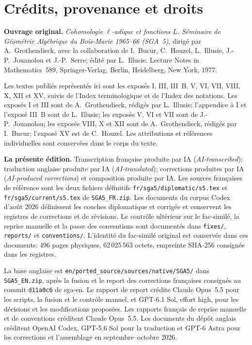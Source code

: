\section*{Cr\'edits, provenance et droits}
\begingroup\small
\noindent\textbf{Ouvrage original.} \textit{Cohomologie $\ell$-adique et fonctions $L$. S\'eminaire de G\'eom\'etrie Alg\'ebrique du Bois-Marie 1965--66 (SGA~5)}, dirig\'e par A.~Grothendieck, avec la collaboration de I.~Bucur, C.~Houzel, L.~Illusie, J.-P.~Jouanolou et J.-P.~Serre; \'edit\'e par L.~Illusie. Lecture Notes in Mathematics~589, Springer-Verlag, Berlin, Heidelberg, New York, 1977.

Les textes publi\'es repr\'esent\'es ici sont les expos\'es I, III, III~B, V, VI, VII, VIII, X, XII et XV, suivis de l'Index terminologique et de l'Index des notations. Les expos\'es I et III sont de A.~Grothendieck, r\'edig\'es par L.~Illusie; l'appendice \`a I et l'expos\'e III~B sont de L.~Illusie; les expos\'es V, VI et VII sont de J.-P.~Jouanolou; les expos\'es VIII, X et XII sont de A.~Grothendieck, r\'edig\'es par I.~Bucur; l'expos\'e XV est de C.~Houzel. Les attributions et r\'ef\'erences individuelles sont conserv\'ees dans le corps du texte.

\noindent\textbf{La pr\'esente \'edition.} Transcription fran\c{c}aise produite par IA (\textit{AI-transcribed}); traduction anglaise produite par IA (\textit{AI-translated}); corrections produites par IA (\textit{AI-produced corrections}) et composition produite par IA. Les sources fran\c{c}aises de r\'ef\'erence sont les deux fichiers d\'efinitifs \texttt{fr/sga5/diplomatic/s5.tex} et \texttt{fr/sga5/current/s5.tex} de \texttt{SGA5\_FR.zip}. Les documents du corpus Codex d'ao\^ut 2026 d\'efinissent les couches diplomatique et corrig\'ee et conservent les registres de corrections et de r\'evisions. Le contr\^ole ult\'erieur sur le fac-simil\'e, la reprise manuelle et la passe des conventions sont document\'es dans \texttt{fixes/}, \texttt{reports/} et \texttt{conventions/}. L'identit\'e du fac-simil\'e original est conserv\'ee dans ces documents: 496 pages physiques, 62\,025\,563 octets, empreinte SHA-256 consign\'ee dans les registres.

La base anglaise est \texttt{en/ported\_source/sources/native/SGA5/} dans \texttt{SGA5\_EN.zip}, apr\`es la fusion et le report des corrections fran\c{c}aises consign\'es au commit \texttt{d11a0c6} de sga-en. Le rapport de report cr\'edite Claude Opus~5.5 pour les scripts, la fusion et le contr\^ole manuel, et GPT-6.1 Sol, effort high, pour les d\'ecisions et les modifications propos\'ees. Les rapports fran\c{c}ais de reprise manuelle et de conventions cr\'editent Claude Opus~5.5. Les documents du d\'ep\^ot anglais cr\'editent OpenAI Codex, GPT-5.6 Sol pour la traduction et GPT-6 Astra pour les corrections et l'assemblage en septembre--octobre 2026.

